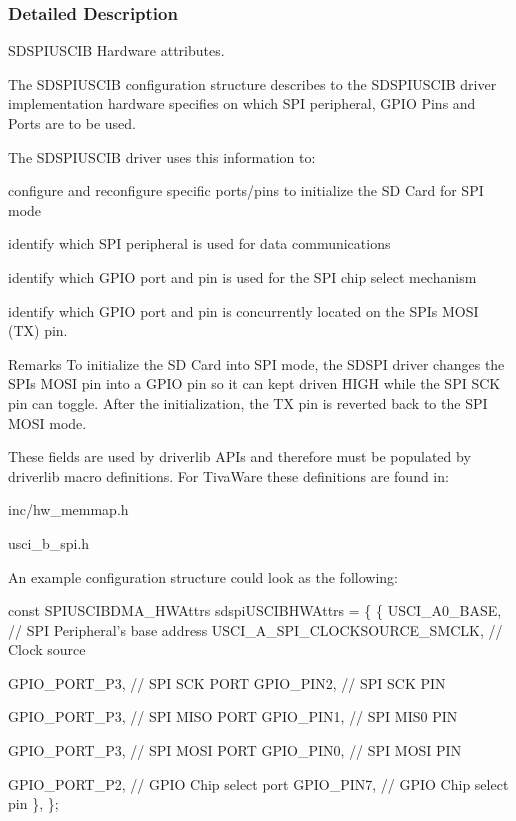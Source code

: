 \subsubsection{Detailed Description}
S\+D\+S\+P\+I\+U\+S\+C\+I\+B Hardware attributes. 

The S\+D\+S\+P\+I\+U\+S\+C\+I\+B configuration structure describes to the S\+D\+S\+P\+I\+U\+S\+C\+I\+B driver implementation hardware specifies on which S\+P\+I peripheral, G\+P\+I\+O Pins and Ports are to be used.

The S\+D\+S\+P\+I\+U\+S\+C\+I\+B driver uses this information to\+:
\begin{DoxyItemize}
\item configure and reconfigure specific ports/pins to initialize the S\+D Card for S\+P\+I mode
\item identify which S\+P\+I peripheral is used for data communications
\item identify which G\+P\+I\+O port and pin is used for the S\+P\+I chip select mechanism
\item identify which G\+P\+I\+O port and pin is concurrently located on the S\+P\+I\textquotesingle{}s M\+O\+S\+I (T\+X) pin.
\end{DoxyItemize}

\begin{DoxyRemark}{Remarks}
To initialize the S\+D Card into S\+P\+I mode, the S\+D\+S\+P\+I driver changes the S\+P\+I\textquotesingle{}s M\+O\+S\+I pin into a G\+P\+I\+O pin so it can kept driven H\+I\+G\+H while the S\+P\+I S\+C\+K pin can toggle. After the initialization, the T\+X pin is reverted back to the S\+P\+I M\+O\+S\+I mode.
\end{DoxyRemark}
These fields are used by driverlib A\+P\+Is and therefore must be populated by driverlib macro definitions. For Tiva\+Ware these definitions are found in\+:
\begin{DoxyItemize}
\item inc/hw\+\_\+memmap.\+h
\item usci\+\_\+b\+\_\+spi.\+h
\end{DoxyItemize}

An example configuration structure could look as the following\+: 
\begin{DoxyCode}
\textcolor{keyword}{const} SPIUSCIBDMA_HWAttrs sdspiUSCIBHWAttrs = \{
    \{
         USCI\_A0\_BASE, \textcolor{comment}{// SPI Peripheral's base address}
         USCI\_A\_SPI\_CLOCKSOURCE\_SMCLK, \textcolor{comment}{// Clock source}

         GPIO\_PORT\_P3,  \textcolor{comment}{// SPI SCK PORT}
         GPIO\_PIN2,     \textcolor{comment}{// SPI SCK PIN}

         GPIO\_PORT\_P3,  \textcolor{comment}{// SPI MISO PORT}
         GPIO\_PIN1,     \textcolor{comment}{// SPI MIS0 PIN}

         GPIO\_PORT\_P3,  \textcolor{comment}{// SPI MOSI PORT}
         GPIO\_PIN0,     \textcolor{comment}{// SPI MOSI PIN}

         GPIO\_PORT\_P2,  \textcolor{comment}{// GPIO Chip select port}
         GPIO\_PIN7,     \textcolor{comment}{// GPIO Chip select pin}
     \},
\};
\end{DoxyCode}
 

